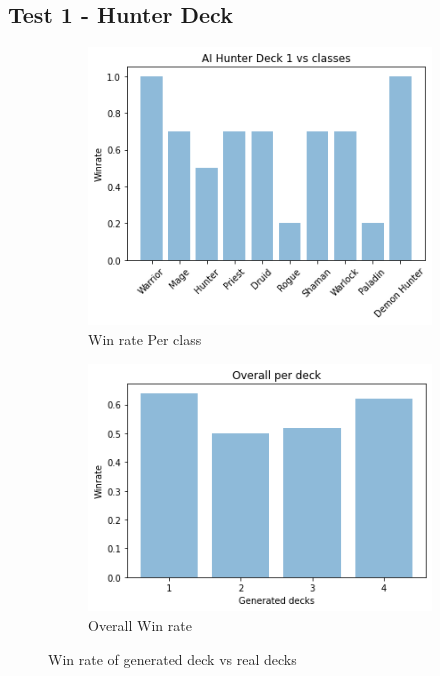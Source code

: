 \documentclass{report} %
\begin{document}
\subsection{Test 1 - Hunter Deck}
\begin{figure}[H]
\centering
\begin{subfigure}{.5\textwidth}
 \centering
 \includegraphics[width=1\linewidth]{TestImages/HunterDeckWinrateClasses}
 \caption{Win rate Per class}
\end{subfigure}%
\begin{subfigure}{.5\textwidth}
 \centering
 \includegraphics[width=1\linewidth]{TestImages/HunterAllGeneratedDeckOverallWinrate}
 \caption{Overall Win rate}
\end{subfigure}
\caption{Win rate of generated deck vs real decks}
\end{figure}
\end{document}
